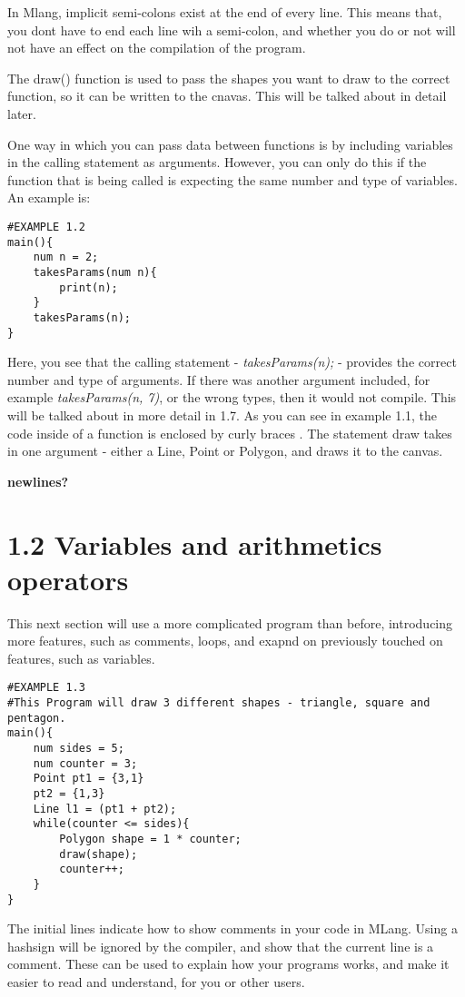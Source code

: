 \documentclass{l3proj}
\begin{document}
In Mlang, implicit semi-colons exist at the end of every line. This means that, you dont have to end each line wih a semi-colon, and whether you do or not will not have an effect on the compilation of the program. 

The draw() function is used to pass the shapes you want to draw to the correct function, so it can be written to the cnavas. This will be talked about in detail later.

One way in which you can pass data between functions is by including variables in the calling statement as arguments. However, you can only do this if the function that is being called is expecting the same number and type of variables. An example is:\\
\begin{lstlisting}
#EXAMPLE 1.2
main(){
	num n = 2;
	takesParams(num n){
		print(n);
	}
	takesParams(n);
}
\end{lstlisting}
Here, you see that the calling statement - \textit{takesParams(n);} - provides the correct number and type of arguments. If there was another argument included, for example \textit{takesParams(n, 7)}, or the wrong types, then it would not compile. This will be talked about in more detail in 1.7. As you can see in example 1.1, the code inside of a function is enclosed by curly braces {   }. The statement draw takes in one argument - either a Line, Point or Polygon, and draws it to the canvas.

\textbf{newlines?}

\section{1.2 Variables and arithmetics operators}
This next section will use a more complicated program than before, introducing more features, such as comments, loops, and exapnd on previously touched on features, such as variables.
\begin{lstlisting}
#EXAMPLE 1.3
#This Program will draw 3 different shapes - triangle, square and pentagon.
main(){
	num sides = 5;
	num counter = 3;
	Point pt1 = {3,1}
	pt2 = {1,3}
	Line l1 = (pt1 + pt2);
	while(counter <= sides){
		Polygon shape =	1 * counter;
		draw(shape);
		counter++;
	}
}
\end{lstlisting}

The initial lines indicate how to show comments in your code in MLang. Using a hashsign will be ignored by the compiler, and show that the current line is a comment. These can be used to explain how your programs works, and make it easier to read and understand, for you or other users.
\end{document}
